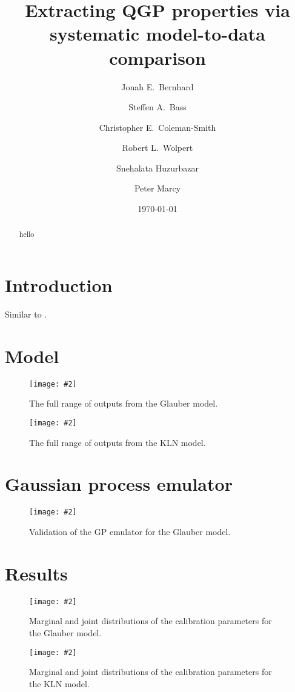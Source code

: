 \documentclass[aps, prc, reprint, amsmath]{revtex4-1}
\newcommand{\widefig}[3][t]{
  \begin{figure*}[#1]
    \texttt{[image: \#2]}
    \caption{\label{fig:#2}#3}
  \end{figure*}
}
\begin{document}
\title{Extracting QGP properties via systematic model-to-data comparison}

\author{Jonah E.\ Bernhard}
\author{Steffen A.\ Bass}
\author{Christopher E.\ Coleman-Smith}
\author{Robert L.\ Wolpert}

\author{Snehalata Huzurbazar}

\author{Peter Marcy}


\date{\today}

\begin{abstract}
  hello
\end{abstract}

\maketitle


\section{Introduction}

Similar to \cite{pratt-mtd, soltz-mtd}.


\section{Model}

\widefig{prior_draws_glb}{
  The full range of outputs from the Glauber model.
}

\widefig{prior_draws_kln}{
  The full range of outputs from the KLN model.
}


\section{Gaussian process emulator}


\widefig{validation_glb}{
  Validation of the GP emulator for the Glauber model.
}


\section{Results}

\cite{alice-cumulants}

\widefig{calibration_posterior_glb}{
  Marginal and joint distributions of the calibration parameters for the Glauber model.
}

\widefig{calibration_posterior_kln}{
  Marginal and joint distributions of the calibration parameters for the KLN model.
}
\end{document}
